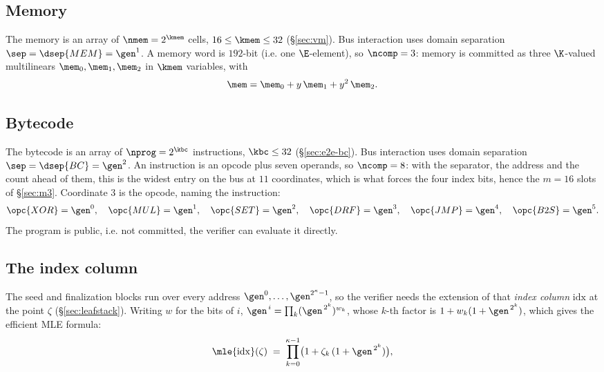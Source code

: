 \subsection{Memory}\label{sec:memchan}

The memory is an array of $\nmem = 2^{\kmem}$ cells, $16\le\kmem\le32$ (\S\ref{sec:vm}). Bus interaction uses domain separation $\sep=\dsep{MEM} = \gen^{1}$. A memory word is $192$-bit (i.e. one $\E$-element), so $\ncomp=3$: memory is committed as three $\K$-valued multilinears $\mem_0,\mem_1,\mem_2$ in $\kmem$ variables, with
\[
  \mem=\mem_0+y\,\mem_1+y^2\,\mem_2 .
\]

\subsection{Bytecode}\label{sec:bytecode}

The bytecode is an array of $\nprog = 2^{\kbc}$ instructions, $\kbc \le 32$ (\S\ref{sec:e2e-bc}). Bus interaction uses domain separation $\sep=\dsep{BC} = \gen^{2}$. An instruction is an opcode plus seven operands, so $\ncomp=8$: with the separator, the address and the count ahead of them, this is the widest entry on the bus at $11$ coordinates, which is what forces the four index bits, hence the $m=16$ slots of \S\ref{sec:m3}. Coordinate $3$ is the opcode, naming the instruction:
\[
  \opc{XOR}=\gen^{0},\quad \opc{MUL}=\gen^{1},\quad \opc{SET}=\gen^{2},\quad \opc{DRF}=\gen^{3},\quad \opc{JMP}=\gen^{4},\quad \opc{B2S}=\gen^{5}.
\] The program is public, i.e. not committed, the verifier can evaluate it directly.

\subsection{The index column}\label{sec:idxcol}

The seed and finalization blocks run over every address $\gen^{0},\dots,\gen^{2^{\kappa}-1}$, so the verifier needs the extension of that \emph{index column} $\mathrm{idx}$ at the point $\zeta$ (\S\ref{sec:leafstack}). Writing $w$ for the bits of $i$, $\gen^{\,i}=\prod_k(\gen^{\,2^{k}})^{w_k}$, whose $k$-th factor is $1+w_k(1+\gen^{\,2^{k}})$, which gives the efficient MLE formula:
\[
  \mle{\mathrm{idx}}(\zeta)\;=\;\prod_{k=0}^{\kappa-1}\bigl(1+\zeta_k\,(1+\gen^{\,2^{k}})\bigr),
\]
